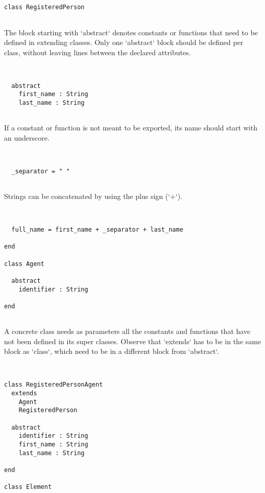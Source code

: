\documentclass[12pt,a4paper]{article}
\begin{document}
\begin{lstlisting}


class RegisteredPerson


\end{lstlisting}

  The block starting with `abstract` denotes constants or functions that need to be defined
   in extending classes. Only one `abstract` block should be defined per class, without
   leaving lines between the declared attributes.


\begin{lstlisting}


  abstract
    first_name : String
    last_name : String


\end{lstlisting}

  If a constant or function is not meant to be exported, its name should start with an
   underscore.


\begin{lstlisting}


  _separator = " "


\end{lstlisting}

  Strings can be concatenated by using the plus sign (`+`).


\begin{lstlisting}


  full_name = first_name + _separator + last_name

end

class Agent

  abstract
    identifier : String

end


\end{lstlisting}

A concrete class needs as parameters all the constants and functions that have not been
 defined in its super classes. Observe that `extends` has to be in the same block as
 `class`, which need to be in a different block from `abstract`.


\begin{lstlisting}


class RegisteredPersonAgent
  extends
    Agent
    RegisteredPerson

  abstract
    identifier : String
    first_name : String
    last_name : String

end

class Element


\end{lstlisting}
\end{document}
